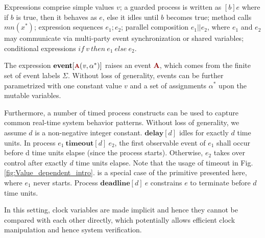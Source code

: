 \documentclass[acmsmall,10pt,review]{acmart}
\newcommand{\anyevent}[1]{{\textcolor{darkred}
{{\textbf{\footnotesize #1}}}}}
\newcommand{\code}[1]{{\tt{\ensuremath{\m{#1}}}}}
\newcommand{\m}{\mathit}
\newcommand\figref[1]{Fig. \textcolor{black}{\ref{#1}}.}
\begin{document}
{Expressions comprise simple values \code{v};
a guarded process is written as \code{[b]e} where if \code{b} is true, 
then it behaves as \code{e}, else it idles until \code{b} becomes true; 
method calls \code{mn({x^*})}; 
expression sequences \code{e_1;e_2};
parallel composition \code{e_1 || e_2}, where \code{e_1} and \code{e_2} 
may communicate via multi-party event synchronization or shared variables; 
conditional expressions \code{{if}\ v\ {then}\ e_1\ {else}\ e_2}. 

The expression \code{ \textbf{event} [\anyevent{A}(v,  \alpha^*)] } 
raises an event \anyevent{A}, which comes from the finite 
set of event labels \code{\Sigma}. %
Without loss of generality, events can be further parametrized with 
one constant value \code{v} and a set of assignments \code{\alpha^*} upon 
the mutable variables. %



Furthermore, a number of timed process constructs can be used to capture common 
real-time system behavior patterns. Without loss of generality, we 
assume \code{d} is a non-negative integer constant.  
$\textbf{delay} [d]$ idles for exactly $d$ 
time units.
 In process $e_1\ \textbf{timeout} [d]\ e_2$, the first observable event of 
$e_1$ shall occur before d time units elapse (since the process starts). 
Otherwise, $e_2$ takes over control after exactly $d$ time units elapse. 
Note that the usage of timeout in \figref{fig:Value_dependent_intro} is a 
special case of the primitive presented here, where \code{e_1} never starts. 
Process $\textbf{deadline} [d]\ e$ constrains $e$ to terminate before $d$ time units. 


In this setting, clock variables are 
made implicit and hence they cannot be compared with each other 
directly, which potentially allows efficient clock manipulation and 
hence system verification.


}
\end{document}
